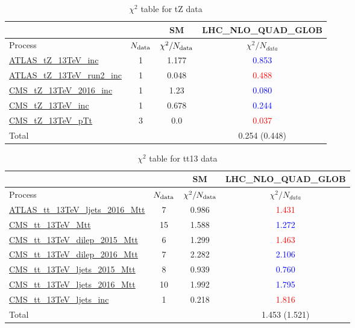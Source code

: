 \documentclass{article}
\begin{document}
\begin{table}[H]
\centering
\begin{tabular}{|l|c|c|c|}
\hline
 \multicolumn{2}{|c|}{} & SM& LHC_NLO_QUAD_GLOB\\ \hline
Process & $N_{\rm data}$ & $\chi^ 2/N_{\rm data}$& $\chi^ 2/N_{data}$\\ \hline
\href{https://arxiv.org}{ATLAS_tZ_13TeV_inc} & 1 & 1.177 & \textcolor{blue}                            {0.853} \\ \hline
\href{https://arxiv.org}{ATLAS_tZ_13TeV_run2_inc} & 1 & 0.048 & \textcolor{red}                            {0.488} \\ \hline
\href{https://arxiv.org}{CMS_tZ_13TeV_2016_inc} & 1 & 1.23 & \textcolor{blue}                            {0.080} \\ \hline
\href{https://arxiv.org}{CMS_tZ_13TeV_inc} & 1 & 0.678 & \textcolor{blue}                            {0.244} \\ \hline
\href{https://arxiv.org}{CMS_tZ_13TeV_pTt} & 3 & 0.0 & \textcolor{red}                            {0.037} \\ \hline
\hline Total & &  & 0.254 (0.448) \\ \hline
\end{tabular}
\caption{$\chi^2$ table for tZ data}
\end{table}
\begin{table}[H]
\centering
\begin{tabular}{|l|c|c|c|}
\hline
 \multicolumn{2}{|c|}{} & SM& LHC_NLO_QUAD_GLOB\\ \hline
Process & $N_{\rm data}$ & $\chi^ 2/N_{\rm data}$& $\chi^ 2/N_{data}$\\ \hline
\href{https://arxiv.org}{ATLAS_tt_13TeV_ljets_2016_Mtt} & 7 & 0.986 & \textcolor{red}                            {1.431} \\ \hline
\href{https://arxiv.org}{CMS_tt_13TeV_Mtt} & 15 & 1.588 & \textcolor{blue}                            {1.272} \\ \hline
\href{https://arxiv.org}{CMS_tt_13TeV_dilep_2015_Mtt} & 6 & 1.299 & \textcolor{red}                            {1.463} \\ \hline
\href{https://arxiv.org}{CMS_tt_13TeV_dilep_2016_Mtt} & 7 & 2.282 & \textcolor{blue}                            {2.106} \\ \hline
\href{https://arxiv.org}{CMS_tt_13TeV_ljets_2015_Mtt} & 8 & 0.939 & \textcolor{blue}                            {0.760} \\ \hline
\href{https://arxiv.org}{CMS_tt_13TeV_ljets_2016_Mtt} & 10 & 1.992 & \textcolor{blue}                            {1.795} \\ \hline
\href{https://arxiv.org}{CMS_tt_13TeV_ljets_inc} & 1 & 0.218 & \textcolor{red}                            {1.816} \\ \hline
\hline Total & &  & 1.453 (1.521) \\ \hline
\end{tabular}
\caption{$\chi^2$ table for tt13 data}
\end{table}
\end{document}
